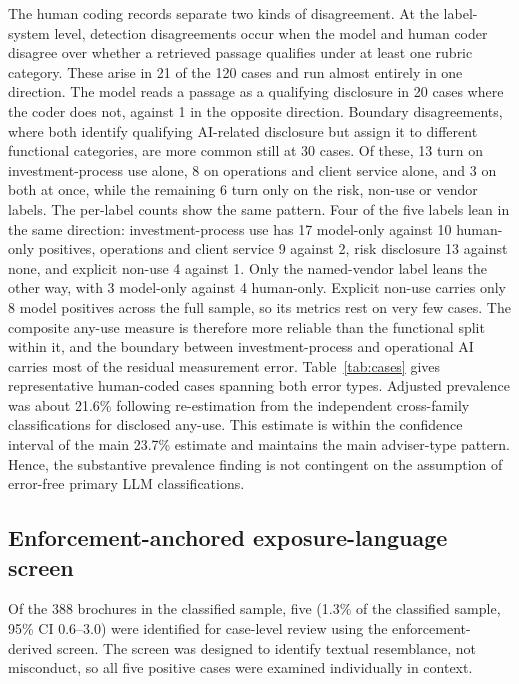 \documentclass[utf8]{FrontiersinHarvard}
\begin{document}
The human coding records separate two kinds of disagreement. At the label-system level, detection disagreements occur when the model and human coder disagree over whether a retrieved passage qualifies under at least one rubric category. These arise in 21 of the 120 cases and run almost entirely in one direction. The model reads a passage as a qualifying disclosure in 20 cases where the coder does not, against 1 in the opposite direction. Boundary disagreements, where both identify qualifying AI-related disclosure but assign it to different functional categories, are more common still at 30 cases. Of these, 13 turn on investment-process use alone, 8 on operations and client service alone, and 3 on both at once, while the remaining 6 turn only on the risk, non-use or vendor labels. The per-label counts show the same pattern. Four of the five labels lean in the same direction: investment-process use has 17 model-only against 10 human-only positives, operations and client service 9 against 2, risk disclosure 13 against none, and explicit non-use 4 against 1. Only the named-vendor label leans the other way, with 3 model-only against 4 human-only. Explicit non-use carries only 8 model positives across the full sample, so its metrics rest on very few cases. The composite any-use measure is therefore more reliable than the functional split within it, and the boundary between investment-process and operational AI carries most of the residual measurement error. Table~\ref{tab:cases} gives representative human-coded cases spanning both error types. Adjusted prevalence was about 21.6\% following re-estimation from the independent cross-family classifications for disclosed any-use. This estimate is within the confidence interval of the main 23.7\% estimate and maintains the main adviser-type pattern. Hence, the substantive prevalence finding is not contingent on the assumption of error-free primary LLM classifications.

\subsection{Enforcement-anchored exposure-language screen}

Of the 388 brochures in the classified sample, five (1.3\% of the classified sample, 95\% CI 0.6--3.0) were identified for case-level review using the enforcement-derived screen. The screen was designed to identify textual resemblance, not misconduct, so all five positive cases were examined individually in context.
\end{document}
